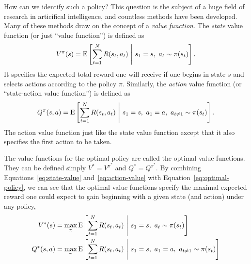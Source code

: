 How can we identify such a policy? This question is the subject of a huge field of research in articifical intelligence, and countless methods have been developed. Many of these methods draw on the concept of a \emph{value function}. The \emph{state} value function (or just ``value function'') is defined as
%
\begin{equation}\label{eq:state-value}
  V^\pi(s) = \operatorname*{E} \left[ 
    \sum_{t=1}^{N} R(s_t, a_t)
   \ \middle\vert\ 
   s_1 = s,\ a_t \sim \pi(s_t)
   \right].
\end{equation}
%
It specifies the expected total reward one will receive if one begins in state $s$ and selects actions according to the policy $\pi$. Similarly, the \emph{action} value function (or ``state-action value function'') is defined as
%
\begin{equation}\label{eq:action-value}
  Q^\pi(s, a) = \operatorname*{E} \left[ 
    \sum_{t=1}^{N} R(s_t, a_t)
   \ \middle\vert\ 
   s_1 = s,\ a_1 = a,\ a_{t \neq 1} \sim \pi(s_t)
   \right].
\end{equation}
%
The action value function just like the state value function except that it also specifies the first action to be taken. 

The value functions for the optimal policy are called the optimal value functions. They can be defined simply $V^* = V^{\pi^*}$ and $Q^* = Q^{\pi^*}$. By combining Equations~\ref{eq:state-value} and~\ref{eq:action-value} with Equation~\ref{eq:optimal-policy}, we can see that the optimal value functions specify the maximal expected reward one could expect to gain beginning with a given state (and action) under any policy,
\begin{equation}
  \begin{aligned}
  V^*(s) &= \max_\pi \operatorname*{E} \left[ 
    \sum_{t=1}^{N} R(s_t, a_t)
   \ \middle\vert\ 
   s_1 = s,\ a_t \sim \pi(s_t)
   \right] \\
  Q^*(s, a) &= \max_\pi \operatorname*{E} \left[ 
    \sum_{t=1}^{N} R(s_t, a_t)
   \ \middle\vert\ 
   s_1 = s,\ a_1 = a,\ a_{t \neq 1} \sim \pi(s_t)
   \right]
  \end{aligned}
\end{equation}

